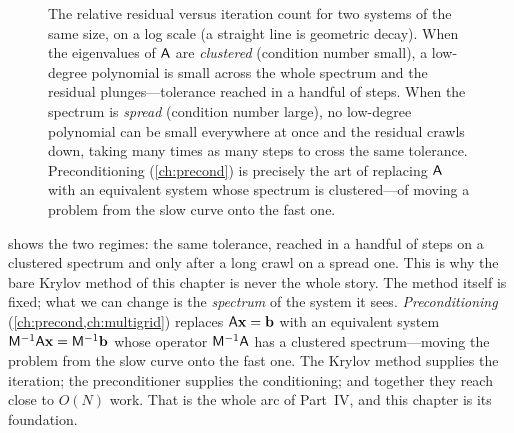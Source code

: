 \begin{figure}[t]
\centering
{}
\caption[Convergence depends on the spectrum]{The relative residual versus
iteration count for two systems of the same size, on a log scale (a straight line
is geometric decay). When the eigenvalues of $\mathsf{A}$ are \emph{clustered}
(condition number small), a low-degree polynomial is small across the whole
spectrum and the residual plunges---tolerance reached in a handful of steps.
When the spectrum is \emph{spread} (condition number large), no low-degree
polynomial can be small everywhere at once and the residual crawls down, taking
many times as many steps to cross the same tolerance. Preconditioning
(\cref{ch:precond}) is precisely the art of replacing $\mathsf{A}$ with an
equivalent system whose spectrum is clustered---of moving a problem from the slow
curve onto the fast one.}
\label{fig:krylov-convergence}
\end{figure}

 shows the two regimes: the same tolerance, reached in
a handful of steps on a clustered spectrum and only after a long crawl on a spread
one. This is why the bare Krylov method of this chapter is never the whole story.
The method itself is fixed; what we can change is the \emph{spectrum} of the system
it sees. \emph{Preconditioning} (\cref{ch:precond,ch:multigrid}) replaces
$\mathsf{A}\mathbf{x}=\mathbf{b}$ with an equivalent system $\mathsf{M}^{-1}\mathsf{A}\mathbf{x}=\mathsf{M}^{-1}\mathbf{b}$
whose operator $\mathsf{M}^{-1}\mathsf{A}$ has a clustered spectrum---moving the problem
from the slow curve onto the fast one. The Krylov method supplies the iteration;
the preconditioner supplies the conditioning; and together they reach close to
$O(N)$ work. That is the whole arc of Part~IV, and this chapter is its foundation.

